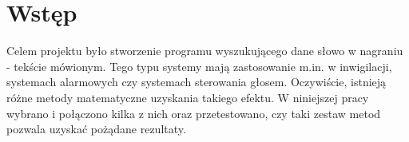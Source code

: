 \section{Wstęp}

Celem projektu było stworzenie programu wyszukującego dane słowo w nagraniu - tekście mówionym. Tego typu systemy mają zastosowanie m.in. w inwigilacji, systemach alarmowych czy systemach sterowania głosem. Oczywiście, istnieją różne metody matematyczne uzyskania takiego efektu. W niniejszej pracy wybrano i połączono kilka z nich oraz przetestowano, czy taki zestaw metod pozwala uzyskać pożądane rezultaty.